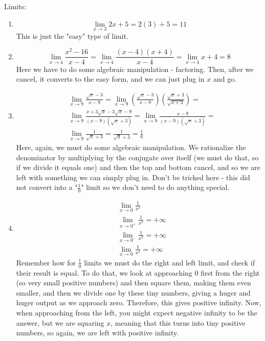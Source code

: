 \documentclass[12pt]{article}
\begin{document}
Limits:
\begin{enumerate}
\item \begin{equation*}
    \lim\limits_{x\rightarrow 3} 2x+5 = 2(3)+5 = 11
\end{equation*} This is just the "easy" type of limit.
\item \begin{equation*}
    \lim\limits_{x\rightarrow 4}\frac{x^2-16}{x-4} = \lim\limits_{x\rightarrow 4}\frac{(x-4)(x+4)}{x-4} = \lim\limits_{x\rightarrow 4}x+4 = 8
\end{equation*} Here we have to do some algebraic manipulation - factoring. Then, after we cancel, it converts to the easy form, and we can just plug in $x$ and go.
\item \begin{align*}
    & \lim\limits_{x\rightarrow 9}\frac{\sqrt{x}-3}{x-9}=  \lim\limits_{x\rightarrow 9}\left(\frac{\sqrt{x}-3}{x-9}\right) \left(\frac{\sqrt{x}+3}{\sqrt{x+3}}\right) = \\  &\lim\limits_{x\rightarrow 9} \frac{x+3\sqrt{x}-3\sqrt{x}-9}{(x-9) (\sqrt{x}+3)}=\lim\limits_{x\rightarrow 9}\frac{x-9}{(x-9)(\sqrt{x}+3)} = \\ & \lim\limits_{x\rightarrow 9}\frac{1}{\sqrt{x}+3} =\frac{1}{\sqrt{9}+3}=\frac{1}{6}
\end{align*}
Here, again, we must do some algebraic manipulation. We rationalize the denominator by multiplying by the conjugate over itself (we must do that, so if we divide it equals one) and then the top and bottom cancel, and so we are left with something we can simply plug in. Don't be tricked here - this did not convert into a "$\frac{1}{0}$" limit so we don't need to do anything special.
\item \begin{align*}
    &\lim\limits_{x\rightarrow 0} \frac{1}{x^2}\\
    &\lim\limits_{x\rightarrow 0^+} \frac{1}{x^2} = +\infty\\
    &\lim\limits_{x\rightarrow 0^-} \frac{1}{x^2} = +\infty\\
    &\lim\limits_{x\rightarrow 0} \frac{1}{x^2} = +\infty
\end{align*}
Remember how for $\frac{1}{0}$ limits we must do the right and left limit, and check if their result is equal. To do that, we look at approaching $0$ first from the right (so very small positive numbers) and then square them, making them even smaller, and then we divide one by these tiny numbers, giving a huger and huger output as we approach zero. Therefore, this gives positive infinity. Now, when approaching from the left, you might expect negative infinity to be the answer, but we are squaring $x$, meaning that this turns into tiny positive numbers, so again, we are left with positive infinity.

\end{enumerate}
\end{document}

